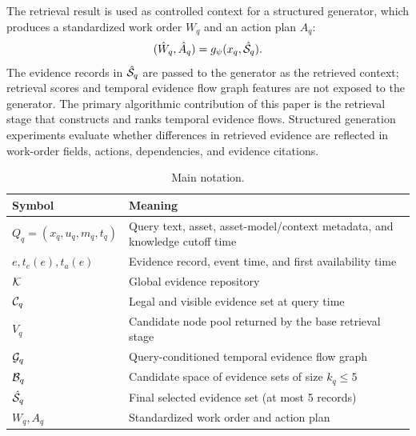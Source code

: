 The retrieval result is used as controlled context for a structured generator, which produces a standardized work order $W_q$ and an action plan $A_q$:
\begin{equation}
(\hat W_q,\hat A_q)=g_{\psi}(x_q,\hat{\mathcal{S}}_q).
\label{eq:downstream_generation}
\end{equation}
The evidence records in $\hat{\mathcal{S}}_q$ are passed to the generator as the retrieved context; retrieval scores and temporal evidence flow graph features are not exposed to the generator. The primary algorithmic contribution of this paper is the retrieval stage that constructs and ranks temporal evidence flows. Structured generation experiments evaluate whether differences in retrieved evidence are reflected in work-order fields, actions, dependencies, and evidence citations.

\begin{table}[t]
\caption{Main notation.}
\label{tab:symbols}
\centering
\small
\begin{tabular}{@{}p{}p{}@{}}
\toprule
Symbol & Meaning \\
\midrule
$Q_q=(x_q,u_q,m_q,t_q)$ & Query text, asset, asset-model/context metadata, and knowledge cutoff time \\
$e,t_e(e),t_a(e)$ & Evidence record, event time, and first availability time \\
$\mathcal{K}$ & Global evidence repository \\
$\mathcal{C}_q$ & Legal and visible evidence set at query time \\
$V_q$ & Candidate node pool returned by the base retrieval stage \\
$\mathcal{G}_q$ & Query-conditioned temporal evidence flow graph \\
$\mathcal{B}_q$ & Candidate space of evidence sets of size $k_q\leq 5$ \\
$\hat{\mathcal{S}}_q$ & Final selected evidence set (at most 5 records) \\
$W_q,A_q$ & Standardized work order and action plan \\
\bottomrule
\end{tabular}
\end{table}
